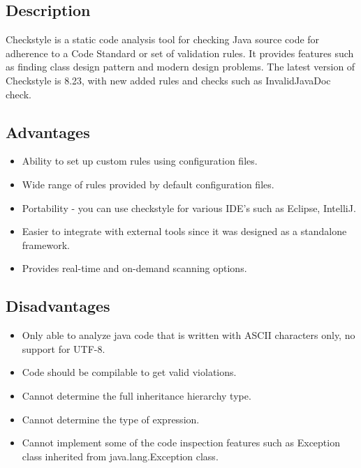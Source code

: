 \documentclass[a4paper,12pt]{article}
\begin{document}
\subsection{Description}
Checkstyle is a static code analysis tool for checking Java source code for adherence to a Code Standard or set of validation rules. It provides features such as finding class design pattern and modern design problems. The latest version of Checkstyle is 8.23, with new added rules and checks such as InvalidJavaDoc check.

\subsection{Advantages}
\begin{itemize}
	\item Ability to set up custom rules using configuration files.
	\item Wide range of rules provided by default configuration files.
	\item Portability - you can use checkstyle for various IDE's such as Eclipse, IntelliJ.
	\item Easier to integrate with external tools since it was designed as a standalone framework.
	\item Provides real-time and on-demand scanning options.
\end{itemize}

\subsection{Disadvantages}
\begin{itemize}
	\item Only able to analyze java code that is written with ASCII characters only, no support for UTF-8.
	\item Code should be compilable to get valid violations.
	\item Cannot determine the full inheritance hierarchy type.
	\item Cannot determine the type of expression.
	\item Cannot implement some of the code inspection features such as Exception class inherited from java.lang.Exception class.
	
\end{itemize}



\newpage
\end{document}
